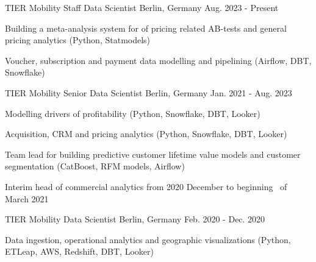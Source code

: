 
\begin{cventries}


  \cventry
    {TIER Mobility} %
    {Staff Data Scientist} %
    {Berlin, Germany} %
    {Aug. 2023 - Present} %
    {
      \begin{cvitems}
        \item {Building a meta-analysis system for of pricing related AB-tests and general pricing analytics (Python, Statmodels)}
        \item {Voucher, subscription and payment data modelling and pipelining (Airflow, DBT, Snowflake)}
      \end{cvitems}
    }

  \cventry
    {TIER Mobility} %
    {Senior Data Scientist} %
    {Berlin, Germany} %
    {Jan. 2021 - Aug. 2023} %
    {
      \begin{cvitems}
        \item {Modelling drivers of profitability (Python, Snowflake, DBT, Looker)}
        \item {Acquisition, CRM and pricing analytics (Python, Snowflake, DBT, Looker)}
        \item {Team lead for building predictive customer lifetime
        value models and customer segmentation (CatBoost, RFM models, Airflow)}
        \item {Interim head of commercial analytics from 2020 December to beginning \
        of March 2021}
      \end{cvitems}
    }

  \cventry
    {TIER Mobility} %
    {Data Scientist} %
    {Berlin, Germany} %
    {Feb. 2020 - Dec. 2020} %
    {
      \begin{cvitems}
        \item {Data ingestion, operational analytics and geographic
        visualizations (Python, ETLeap, AWS, Redshift, DBT, Looker)}
      \end{cvitems}
    }


\end{cventries}
